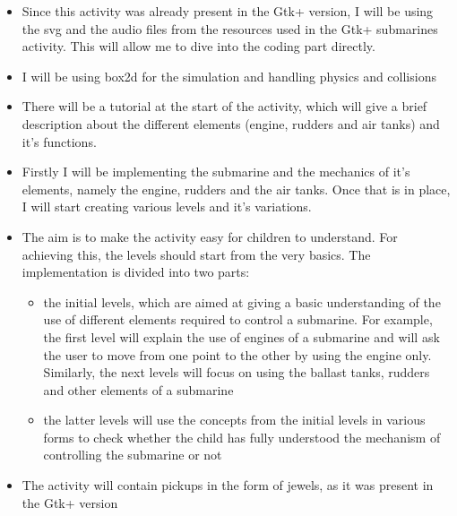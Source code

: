 \documentclass[preprint,12pt]{elsarticle}
\begin{document}
\begin{itemize}


\item Since this activity was already present in the Gtk+ version, I will be using the svg and the audio files from the resources used in the Gtk+ submarines activity. This will allow me to dive into the coding part directly. 

\item I will be using box2d for the simulation and handling physics and collisions

\item There will be a tutorial at the start of the activity, which will give a brief description about the different elements (engine, rudders and air tanks) and it's functions.

\item Firstly I will be implementing the submarine and the mechanics of it's elements, namely the engine, rudders and the air tanks. Once that is in place, I will start creating various levels and it's variations.


\item The aim is to make the activity easy for children to understand. For achieving this, the levels should start from the very basics. The implementation is divided into two parts: 

\begin{itemize}
\item the initial levels, which are aimed at giving a basic understanding of the use of different elements required to control a submarine. For example, the first level will explain the use of engines of a submarine and will ask the user to move from one point to the other by using the engine only. Similarly, the next levels will focus on using the ballast tanks, rudders and other elements of a submarine
\item the latter levels will use the concepts from the initial levels in various forms to check whether the child has fully understood the mechanism of controlling the submarine or not
\end{itemize}
\item The activity will contain pickups in the form of jewels, as it was present in the Gtk+ version


\end{itemize}
\end{document}
